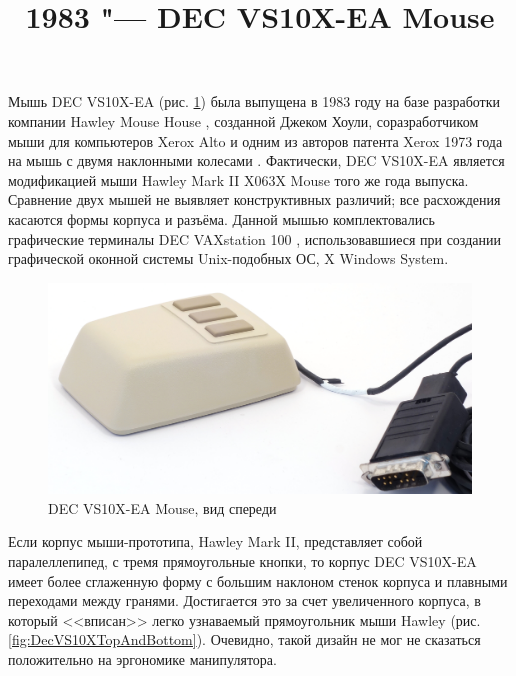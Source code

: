 \documentclass[11pt, a4paper]{article}
\begin{document}
\title{1983 "--- DEC VS10X-EA Mouse}
\date{}
\maketitle
{}
Мышь DEC VS10X-EA (рис. \ref{fig:DecVS10XPic}) была выпущена в 1983 году на базе разработки компании Hawley Mouse House \cite{hawley,mouses}, созданной Джеком Хоули, соразработчиком мыши для компьютеров Xerox Alto и одним из авторов патента Xerox 1973 года на мышь с двумя наклонными колесами \cite{pat}. Фактически, DEC VS10X-EA является модификацией мыши Hawley Mark II X063X Mouse того же года выпуска. Сравнение двух мышей не выявляет конструктивных различий; все расхождения касаются формы корпуса и разъёма. Данной мышью комплектовались графические терминалы DEC VAXstation 100 \cite{reddit}, использовавшиеся при создании графической оконной системы Unix-подобных ОС, X Windows System.

\begin{figure}[h]
   \centering
    \includegraphics[scale=0.6]{1983_dec_vs10x_ea_mouse/pic_30.jpg}
    \caption{DEC VS10X-EA Mouse, вид спереди}
    \label{fig:DecVS10XPic}
\end{figure}

Если корпус мыши-прототипа, Hawley Mark II, представляет собой паралеллепипед, с тремя прямоугольные кнопки, то корпус DEC VS10X-EA имеет более сглаженную форму с большим наклоном стенок корпуса и плавными переходами между гранями. Достигается это за счет увеличенного корпуса, в который <<вписан>> легко узнаваемый прямоугольник мыши Hawley (рис. \ref{fig:DecVS10XTopAndBottom}). Очевидно, такой дизайн не мог не сказаться положительно на эргономике манипулятора.
\end{document}

